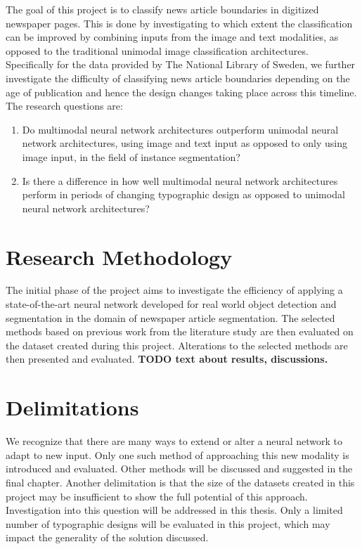 \documentclass[english, bibtex]{kththesis}
\begin{document}
The goal of this project is to classify news article boundaries in digitized newspaper pages. This is done by investigating to which extent the classification can be improved by combining inputs from the image and text modalities, as opposed to the traditional unimodal image classification architectures. Specifically for the data provided by The National Library of Sweden, we further investigate the difficulty of classifying news article boundaries depending on the age of publication and hence the design changes taking place across this timeline. The research questions are:

\begin{enumerate}
\item Do multimodal neural network architectures outperform unimodal neural network architectures, using image and text input as opposed to only using image input, in the field of instance segmentation?
\item Is there a difference in how well multimodal neural network architectures perform in periods of changing typographic design as opposed to unimodal neural network architectures?
\end{enumerate}

\section{Research Methodology}

The initial phase of the project aims to investigate the efficiency of applying a state-of-the-art neural network developed for real world object detection and segmentation in the domain of newspaper article segmentation. The selected methods based on previous work from the literature study are then evaluated on the dataset created during this project. Alterations to the selected methods are then presented and evaluated. \textbf{TODO text about results, discussions.}

\section{Delimitations}

We recognize that there are many ways to extend or alter a neural network to adapt to new input. Only one such method of approaching this new modality is introduced and evaluated. Other methods will be discussed and suggested in the final chapter. Another delimitation is that the size of the datasets created in this project may be insufficient to show the full potential of this approach. Investigation into this question will be addressed in this thesis. Only a limited number of typographic designs will be evaluated in this project, which may impact the generality of the solution discussed.
\end{document}
